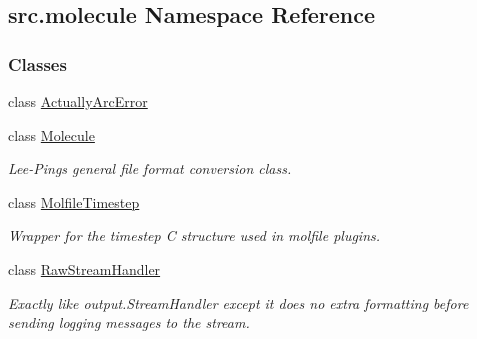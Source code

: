 \hypertarget{namespacesrc_1_1molecule}{}\subsection{src.\+molecule Namespace Reference}
\label{namespacesrc_1_1molecule}
\subsubsection*{Classes}
\begin{DoxyCompactItemize}
\item 
class \hyperlink{classsrc_1_1molecule_1_1ActuallyArcError}{Actually\+Arc\+Error}
\item 
class \hyperlink{classsrc_1_1molecule_1_1Molecule}{Molecule}
\begin{DoxyCompactList}\small\item\em Lee-\/\+Ping\textquotesingle{}s general file format conversion class. \end{DoxyCompactList}\item 
class \hyperlink{classsrc_1_1molecule_1_1MolfileTimestep}{Molfile\+Timestep}
\begin{DoxyCompactList}\small\item\em Wrapper for the timestep C structure used in molfile plugins. \end{DoxyCompactList}\item 
class \hyperlink{classsrc_1_1molecule_1_1RawStreamHandler}{Raw\+Stream\+Handler}
\begin{DoxyCompactList}\small\item\em Exactly like output.\+Stream\+Handler except it does no extra formatting before sending logging messages to the stream. \end{DoxyCompactList}\end{DoxyCompactItemize}
